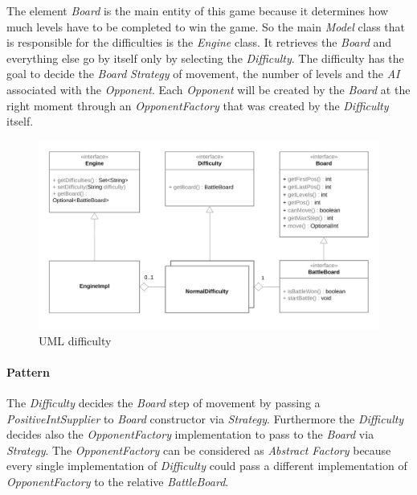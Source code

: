 \documentclass[12pt, a4paper]{report}
\begin{document}
            The element \emph{Board} is the main entity of this game because it determines how much
            levels have to be completed to win the game. So the main \emph{Model} class that is responsible for
            the difficulties is the \emph{Engine} class. It retrieves the \emph{Board} and everything else go by itself
            only by selecting the \emph{Difficulty}. The difficulty has the goal to decide the \emph{Board} \emph{Strategy} of
            movement, the number of levels and the \emph{AI} associated with the \emph{Opponent}. Each \emph{Opponent} will
            be created by the \emph{Board} at the right moment through an \emph{OpponentFactory} that was created by the \emph{Difficulty}
            itself.

            \begin{figure}[ht]
            \centering{}
            \includegraphics[width=\textwidth]{difficulty}
            \caption{UML difficulty}
            \end{figure}

            \paragraph{Pattern}

            The \emph{Difficulty} decides the \emph{Board} step of movement by passing a \emph{PositiveIntSupplier} to \emph{Board} constructor via \emph{Strategy}.
            Furthermore the \emph{Difficulty} decides also the \emph{OpponentFactory} implementation to pass to the \emph{Board} via \emph{Strategy}.
            The \emph{OpponentFactory} can be considered as \emph{Abstract Factory} because every single implementation of \emph{Difficulty} could pass
            a different implementation of \emph{OpponentFactory} to the relative \emph{BattleBoard}.
\end{document}
